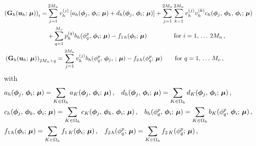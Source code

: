 \documentclass[12pt, a4paper, twoside, openright]{report}
\numberwithin{equation}{chapter}
\theoremstyle{theorem}
\theoremstyle{definition}
\theoremstyle{remark}
\theoremstyle{proposition}
\numberwithin{figure}{chapter}
\newcommand{\bg}[1]{\boldsymbol{#1}}
\begin{document}
		\begin{equation*}
			\begin{aligned}
				&
				\begin{aligned}
					\left( \mathbf{G}_h(\mathbf{u}_h; \, \bg{\mu}) \right)_i = & \sum_{j = 1}^{2 M_n} v_h^{(j)} \left[ a_h(\bg{\phi}_j, \, \bg{\phi}_i; \, \bg{\mu}) + d_h(\bg{\phi}_j, \, \bg{\phi}_i; \, \bg{\mu}) \right] + \sum_{j = 1}^{2 M_n} \sum_{k = 1}^{2 M_n} v_h^{(j)} v_h^{(k)} c_h(\bg{\phi}_j, \, \bg{\phi}_k, \, \bg{\phi}_i; \, \bg{\mu}) \\
					& + \sum_{q = 1}^{M_v} p_h^{(q)} b_h(\phi_q^p, \, \bg{\phi}_i; \, \bg{\mu}) - f_{1\,h}(\bg{\phi}_i; \, \bg{\mu}) \hspace*{1.525cm} \text{for $i = 1, \, \ldots \, 2 M_n$} \, ,
				\end{aligned} \\
				& \left( \mathbf{G}_h(\mathbf{u}_h; \, \bg{\mu}) \right)_{2 M_n + q} = \sum_{j = 1}^{2 M_n} v_h^{(j)} b_h(\phi_q^p, \, \bg{\phi}_j, \, ; \, \bg{\mu}) - f_{2\,h}(\phi_q^p; \, \bg{\mu}) \hspace*{0.7cm} \text{for $q = 1, \, \ldots \, M_v$} \, ,
			\end{aligned}
		\end{equation*}
		with
		\begin{equation*}
			\begin{aligned}
				& a_h(\bg{\phi}_j, \, \bg{\phi}_i; \, \bg{\mu}) = \sum_{K \in \Omega_h} a_K(\bg{\phi}_j, \, \bg{\phi}_i; \, \bg{\mu}) \, , \hspace*{0.3cm} d_h(\bg{\phi}_j, \, \bg{\phi}_i; \, \bg{\mu}) = \sum_{K \in \Omega_h} d_K(\bg{\phi}_j, \, \bg{\phi}_i; \, \bg{\mu}) \, , \\
				& c_h(\bg{\phi}_j, \, \bg{\phi}_k, \, \bg{\phi}_i; \, \bg{\mu}) = \sum_{K \in \Omega_h} c_K(\bg{\phi}_j, \, \bg{\phi}_k, \, \bg{\phi}_i; \, \bg{\mu}) \, , \hspace*{0.3cm} b_h(\phi_q^p, \, \bg{\phi}_i; \, \bg{\mu}) = \sum_{K \in \Omega_h} b_K(\phi_q^p, \, \bg{\phi}_i; \, \bg{\mu}) \, , \\
				& f_{1\,h}(\bg{\phi}_i; \, \bg{\mu}) = \sum_{K \in \Omega_h} f_{1\,K}(\bg{\phi}_i; \, \bg{\mu}) \, , \hspace*{0.3cm} f_{2\,h}(\phi_q^p; \, \bg{\mu}) = \sum_{K \in \Omega_h} f_{2\,K}(\phi_q^p; \, \bg{\mu}) \, ,
			\end{aligned}
		\end{equation*}
\end{document}
